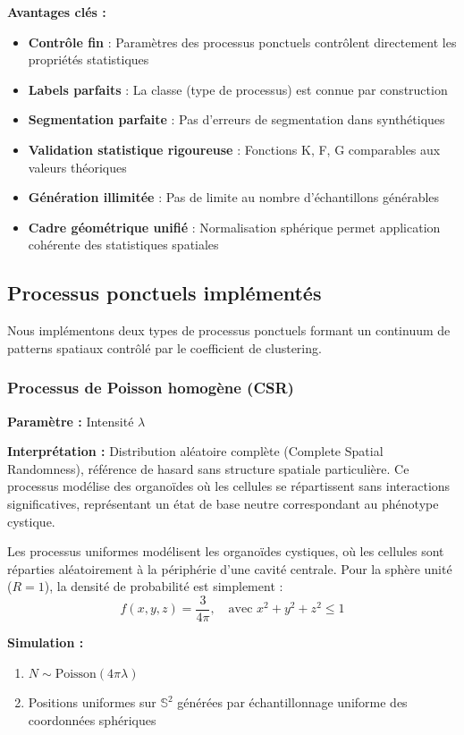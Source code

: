 \textbf{Avantages clés :}
\begin{itemize}
    \item \textbf{Contrôle fin} : Paramètres des processus ponctuels contrôlent directement les propriétés statistiques
    \item \textbf{Labels parfaits} : La classe (type de processus) est connue par construction
    \item \textbf{Segmentation parfaite} : Pas d'erreurs de segmentation dans synthétiques
    \item \textbf{Validation statistique rigoureuse} : Fonctions K, F, G comparables aux valeurs théoriques
    \item \textbf{Génération illimitée} : Pas de limite au nombre d'échantillons générables
    \item \textbf{Cadre géométrique unifié} : Normalisation sphérique permet application cohérente des statistiques spatiales
\end{itemize}

\subsection{Processus ponctuels implémentés}

Nous implémentons deux types de processus ponctuels formant un continuum de patterns spatiaux contrôlé par le coefficient de clustering.

\subsubsection{Processus de Poisson homogène (CSR)}

\textbf{Paramètre :} Intensité $\lambda$

\textbf{Interprétation :} Distribution aléatoire complète (Complete Spatial Randomness), référence de hasard sans structure spatiale particulière. Ce processus modélise des organoïdes où les cellules se répartissent sans interactions significatives, représentant un état de base neutre correspondant au phénotype cystique.

Les processus uniformes modélisent les organoïdes cystiques, où les cellules sont réparties aléatoirement à la périphérie d'une cavité centrale. Pour la sphère unité ($R=1$), la densité de probabilité est simplement :
\[
f(x,y,z) = \frac{3}{4\pi}, \quad \text{avec } x^2+y^2+z^2 \leq 1
\]

\textbf{Simulation :}
\begin{enumerate}
    \item $N \sim \text{Poisson}(4\pi \lambda)$
    \item Positions uniformes sur $\mathbb{S}^2$ générées par échantillonnage uniforme des coordonnées sphériques
\end{enumerate}

